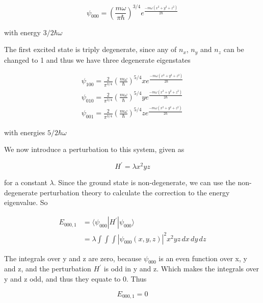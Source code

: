     \begin{equation*}
        \psi_{000} = \left( \frac{m\omega}{\pi\hbar} \right)^{3/4} e^{\frac{-m\omega (x^2 + y^2 + z^2)}{2\hbar}}
    \end{equation*}

    with energy $3/2 \hbar\omega$

    The first excited state is triply degenerate, since any of $n_x$, $n_y$ and $n_z$ can be changed to 1 and thus we have three degenerate eigenstates

    \begin{gather*}
        \psi_{100} = \frac{2}{\pi^{3/4}} \left( \frac{m\omega}{\hbar} \right)^{5/4} x e^{\frac{-m\omega (x^2 + y^2 + z^2)}{2\hbar}} \\
        \psi_{010} = \frac{2}{\pi^{3/4}} \left( \frac{m\omega}{\hbar} \right)^{5/4} y e^{\frac{-m\omega (x^2 + y^2 + z^2)}{2\hbar}} \\
        \psi_{001} = \frac{2}{\pi^{3/4}} \left( \frac{m\omega}{\hbar} \right)^{5/4} z e^{\frac{-m\omega (x^2 + y^2 + z^2)}{2\hbar}} 
    \end{gather*}

    with energies $5/2 \hbar\omega$

    We now introduce a perturbation to this system, given as

    \begin{equation*}
        H^{'} = \lambda x^2yz
    \end{equation*}

    for a constant $\lambda$. Since the ground state is non-degenerate, we can use the non-degenerate perturbation theory to calculate the correction to the energy eigenvalue. So

    \begin{equation*}
        \begin{split}
            E_{000,1} & = \langle \psi_{000} | H^{'} | \psi_{000} \rangle \\
            & = \lambda \int \int \int |\psi_{000}(x,y,z)|^2 x^2yz \, dx \, dy \, dz
        \end{split}
    \end{equation*}

    The integrals over y and z are zero, because $\psi_{000}$ is an even function over x, y and z, and the perturbation $H^{'}$ is odd in y and z. Which makes the integrals over y and z odd, and thus they equate to 0. Thus

    \begin{equation*}
        E_{000,1} = 0
    \end{equation*}

